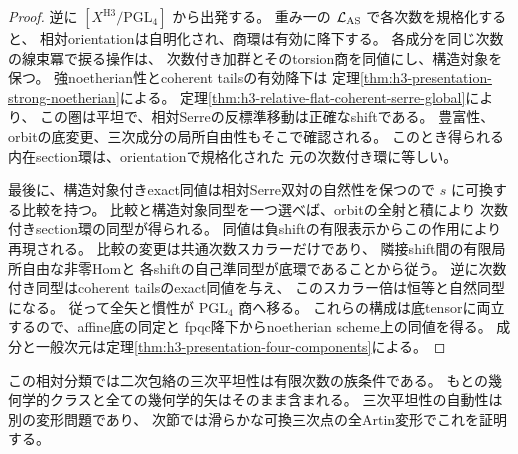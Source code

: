\begin{proof}
逆に $[X^{\mathrm{H3}}/\mathrm{PGL}_4]$ から出発する。
重み一の $\mathcal L_{\rm AS}$ で各次数を規格化すると、
相対orientationは自明化され、商環は有効に降下する。
各成分を同じ次数の線束冪で捩る操作は、
次数付き加群とそのtorsion商を同値にし、構造対象を保つ。
強noetherian性とcoherent tailsの有効降下は
定理\ref{thm:h3-presentation-strong-noetherian}による。
定理\ref{thm:h3-relative-flat-coherent-serre-global}により、
この圏は平坦で、相対Serreの反標準移動は正確なshiftである。
豊富性、orbitの底変更、三次成分の局所自由性もそこで確認される。
このとき得られる内在section環は、orientationで規格化された
元の次数付き環に等しい。

最後に、構造対象付きexact同値は相対Serre双対の自然性を保つので
$s$ に可換する比較を持つ。
比較と構造対象同型を一つ選べば、orbitの全射と積により
次数付きsection環の同型が得られる。
同値は負shiftの有限表示からこの作用により再現される。
比較の変更は共通次数スカラーだけであり、
隣接shift間の有限局所自由な非零Homと
各shiftの自己準同型が底環であることから従う。
逆に次数付き同型はcoherent tailsのexact同値を与え、
このスカラー倍は恒等と自然同型になる。
従って全矢と慣性が $\mathrm{PGL}_4$ 商へ移る。
これらの構成は底tensorに両立するので、affine底の同定と
fpqc降下からnoetherian scheme上の同値を得る。
成分と一般次元は定理\ref{thm:h3-presentation-four-components}による。
\end{proof}

この相対分類では二次包絡の三次平坦性は有限次数の族条件である。
もとの幾何学的クラスと全ての幾何学的矢はそのまま含まれる。
三次平坦性の自動性は別の変形問題であり、
次節では滑らかな可換三次点の全Artin変形でこれを証明する。

